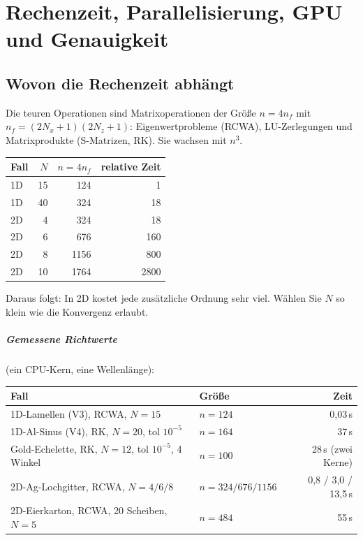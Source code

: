 \chapter{Rechenzeit, Parallelisierung, GPU und Genauigkeit}\label{ch:leistung}
%

\section{Wovon die Rechenzeit abhängt}
Die teuren Operationen sind Matrixoperationen der Größe $n=4n_f$ mit $n_f=(2N_x+1)(2N_z+1)$: Eigenwertprobleme
(RCWA), LU-Zerlegungen und Matrixprodukte (S-Matrizen, RK). Sie wachsen mit $n^3$.
\begin{center}
\small
\begin{tabular}{lrrr}
\toprule
Fall & $N$ & $n=4n_f$ & relative Zeit \\
\midrule
1D & 15 & 124 & 1 \\
1D & 40 & 324 & 18 \\
2D & 4 & 324 & 18 \\
2D & 6 & 676 & 160 \\
2D & 8 & 1156 & 800 \\
2D & 10 & 1764 & 2800 \\
\bottomrule
\end{tabular}
\end{center}
Daraus folgt: In 2D kostet jede zusätzliche Ordnung sehr viel. Wählen Sie $N$ so klein wie die Konvergenz erlaubt.

\paragraph{Gemessene Richtwerte} (ein CPU-Kern, eine Wellenlänge):
\begin{center}
\small
\begin{tabular}{llr}
\toprule
Fall & Größe & Zeit \\
\midrule
1D-Lamellen (V3), RCWA, $N=15$ & $n=124$ & 0,03\,s \\
1D-Al-Sinus (V4), RK, $N=20$, tol $10^{-5}$ & $n=164$ & 37\,s \\
Gold-Echelette, RK, $N=12$, tol $10^{-5}$, 4 Winkel & $n=100$ & 28\,s (zwei Kerne) \\
2D-Ag-Lochgitter, RCWA, $N=4/6/8$ & $n=324/676/1156$ & 0,8 / 3,0 / 13,5\,s \\
2D-Eierkarton, RCWA, 20 Scheiben, $N=5$ & $n=484$ & 55\,s \\
\bottomrule
\end{tabular}
\end{center}

